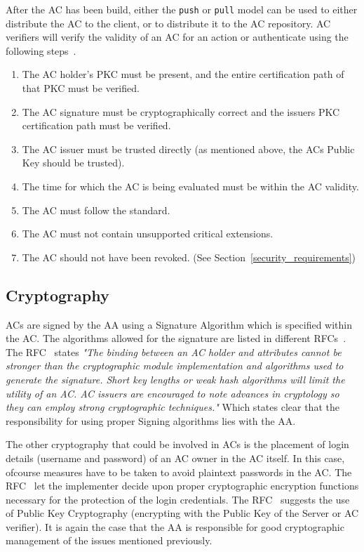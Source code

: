 \documentclass[10pt,conference,a4paper]{IEEEtran}
\begin{document}
After the AC has been build, either the \texttt{push} or \texttt{pull} model can be used to either distribute the AC to the client, or to distribute it to the AC repository. AC verifiers will verify the validity of an AC for an action or authenticate using the following steps~\cite{rfc_ac}.
\begin{enumerate}
	\item The AC holder's PKC must be present, and the entire certification path of that PKC must be verified.
	\item The AC signature must be cryptographically correct and the issuers PKC certification path must be verified.
	\item The AC issuer must be trusted directly (as mentioned above, the ACs Public Key should be trusted).
	\item The time for which the AC is being evaluated must be within the AC validity.
	\item The AC must follow the standard.
	\item The AC must not contain unsupported critical extensions.
	\item The AC should not have been revoked. (See Section~\ref{security_requirements})
\end{enumerate}

\subsection{Cryptography}
ACs are signed by the AA using a Signature Algorithm which is specified within the AC. The algorithms allowed for the signature are listed in different RFCs~\cite{rfc_alg1,rfc_alg2,rfc_alg3,rfc_alg4}. The RFC~\cite{rfc_ac} states \textit{"The binding between an AC holder and attributes cannot be stronger than the cryptographic module implementation and algorithms used to generate the signature.  Short key lengths or weak hash algorithms will limit the utility of an AC. AC issuers are encouraged to note advances in cryptology so they can employ strong cryptographic techniques."} Which states clear that the responsibility for using proper Signing algorithms lies with the AA.

The other cryptography that could be involved in ACs is the placement of login details (username and password) of an AC owner in the AC itself. In this case, ofcourse measures have to be taken to avoid plaintext passwords in the AC. The RFC~\cite{rfc_ac} let the implementer decide upon proper cryptographic encryption functions necessary for the protection of the login credentials. The RFC~\cite{rfc_ac} suggests the use of Public Key Cryptography (encrypting with the Public Key of the Server or AC verifier). It is again the case that the AA is responsible for good cryptographic management of the issues mentioned previously.
\end{document}
